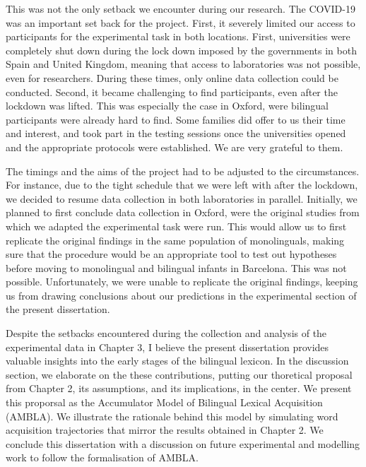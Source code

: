\documentclass[
  12pt,
  b5paperpaper,
  twoside]{scrreprt}
\begin{document}
\begin{spacing}{1.5}
{This was not the only setback we encounter during our research. The
COVID-19 was an important set back for the project. First, it severely
limited our access to participants for the experimental task in both
locations. First, universities were completely shut down during the lock
down imposed by the governments in both Spain and United Kingdom,
meaning that access to laboratories was not possible, even for
researchers. During these times, only online data collection could be
conducted. Second, it became challenging to find participants, even
after the lockdown was lifted. This was especially the case in Oxford,
were bilingual participants were already hard to find. Some families did
offer to us their time and interest, and took part in the testing
sessions once the universities opened and the appropriate protocols were
established. We are very grateful to them.

The timings and the aims of the project had to be adjusted to the
circumstances. For instance, due to the tight schedule that we were left
with after the lockdown, we decided to resume data collection in both
laboratories in parallel. Initially, we planned to first conclude data
collection in Oxford, were the original studies from which we adapted
the experimental task were run. This would allow us to first replicate
the original findings in the same population of monolinguals, making
sure that the procedure would be an appropriate tool to test out
hypotheses before moving to monolingual and bilingual infants in
Barcelona. This was not possible. Unfortunately, we were unable to
replicate the original findings, keeping us from drawing conclusions
about our predictions in the experimental section of the present
dissertation.

Despite the setbacks encountered during the collection and analysis of
the experimental data in Chapter 3, I believe the present dissertation
provides valuable insights into the early stages of the bilingual
lexicon. In the discussion section, we elaborate on the these
contributions, putting our thoretical proposal from Chapter 2, its
assumptions, and its implications, in the center. We present this
proporsal as the Accumulator Model of Bilingual Lexical Acquisition
(AMBLA). We illustrate the rationale behind this model by simulating
word acquisition trajectories that mirror the results obtained in
Chapter 2. We conclude this dissertation with a discussion on future
experimental and modelling work to follow the formalisation of AMBLA.

}
\end{spacing}
\end{document}
